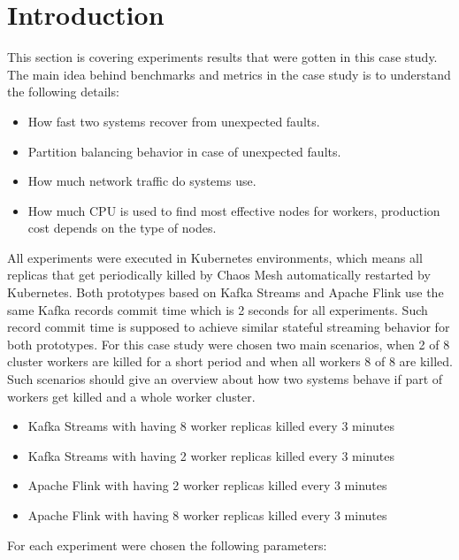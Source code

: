 \section{Introduction}\label{sec:introduction-results}
This section is covering experiments results that were gotten in this case study.
The main idea behind benchmarks and metrics in the case study is to understand
the following details:

\begin{itemize}
    \item How fast two systems recover from unexpected faults.
    \item Partition balancing behavior in case of unexpected faults.
    \item How much network traffic do systems use.
    \item How much CPU is used to find most effective nodes for workers, production cost depends on the type of nodes.
\end{itemize}

All experiments were executed in Kubernetes environments, which means all replicas that
get periodically killed by Chaos Mesh automatically restarted by Kubernetes.
Both prototypes based on Kafka Streams and Apache Flink use the same Kafka records
commit time which is 2 seconds for all experiments.
Such record commit time is supposed to achieve similar stateful streaming behavior
for both prototypes.
For this case study were chosen two main scenarios, when 2 of 8 cluster workers are killed for
a short period and when all workers 8 of 8 are killed.
Such scenarios should give an overview about how two systems behave if part of workers
get killed and a whole worker cluster.


\begin{itemize}
    \item Kafka Streams with having 8 worker replicas killed every 3 minutes
    \item Kafka Streams with having 2 worker replicas killed every 3 minutes
    \item Apache Flink with having 2 worker replicas killed every 3 minutes
    \item Apache Flink with having 8 worker replicas killed every 3 minutes
\end{itemize}

For each experiment were chosen the following parameters:

